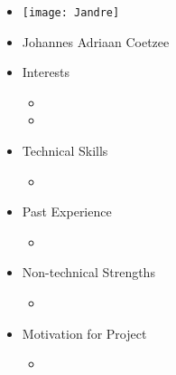 
\begin{itemize}
	\item[] \texttt{[image: Jandre]}
	\item[] Johannes Adriaan Coetzee
	\item Interests
	\begin{itemize}
		\item 
		\item 
	\end{itemize}
	\item Technical Skills
	\begin{itemize}
		\item[] 
	\end{itemize}
	\item Past Experience
	\begin{itemize}
		\item[] 
	\end{itemize}
	\item Non-technical Strengths
	\begin{itemize}
		\item[] 
	\end{itemize}
	\item Motivation for Project
	\begin{itemize}
		\item[] 
	\end{itemize}
\end{itemize}